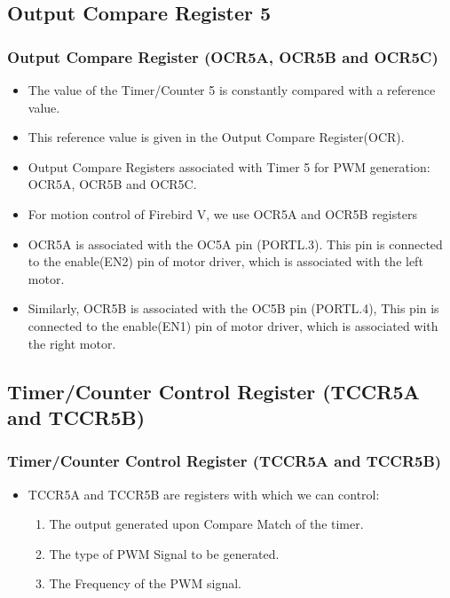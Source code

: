 \documentclass[table,10pt,red]{beamer}	%
\begin{document}
\subsection{Output Compare Register 5} 
\begin{frame}
	\frametitle{Output Compare Register (OCR5A, OCR5B and OCR5C)}
	\begin{itemize}
	  \item <+-|alert@+> The value of the Timer/Counter 5 is constantly compared with a reference value.
	  \item <+-|alert@+> This reference value is given in the Output Compare Register(OCR).
	  \item <+-|alert@+>Output Compare Registers associated with Timer 5 for PWM generation:
	  \pause
	  OCR5A, OCR5B and OCR5C.
	  \pause
	  \item <+-|alert@+> For motion control of Firebird V, we use OCR5A and OCR5B registers
	  \item <+-|alert@+> OCR5A is associated with the OC5A pin (PORTL.3). This pin is connected to the enable(EN2) pin of motor driver, which is associated with the left motor.
	  \item <+-|alert@+> Similarly, OCR5B is associated with the OC5B pin (PORTL.4), This pin is connected to the enable(EN1) pin of motor driver, which is associated with the right motor.
	 	  
	\end{itemize}
\end{frame}

\subsection{Timer/Counter Control Register (TCCR5A and TCCR5B)} %
\begin{frame}
\frametitle{Timer/Counter Control Register (TCCR5A and TCCR5B)}
\begin{itemize}
  \item <+-|alert@+> TCCR5A and TCCR5B are registers with which we can control:
  \begin{enumerate}
  \item <+-|alert@+> The output generated upon Compare Match of the timer.
   \item <+-|alert@+> The type of PWM Signal to be generated.
   \item <+-|alert@+> The Frequency of the PWM signal.
   \end{enumerate}
\end{itemize}
\end{frame}
\end{document}
